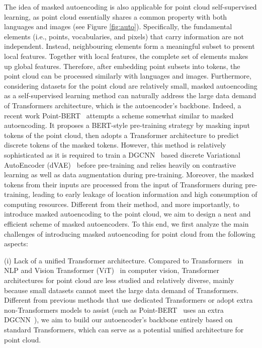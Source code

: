 \documentclass[runningheads]{llncs}
\begin{document}
The idea of masked autoencoding is also applicable for point cloud self-supervised learning, as point cloud essentially shares a common property with both languages and images (see Figure \ref{fig:auto}). Specifically, the fundamental elements (i.e., points, vocabularies, and pixels) that carry information are not independent. Instead, neighbouring elements form a meaningful subset to present local features. Together with local features, the complete set of elements makes up global features. Therefore, after embedding point subsets into tokens, the point cloud can be processed similarly with languages and images. Furthermore, considering datasets for the point cloud are relatively small, masked autoencoding as a self-supervised learning method can naturally address the large data demand of Transformers architecture, which is the autoencoder's backbone. Indeed, a recent work Point-BERT~\cite{pointbert} attempts a scheme somewhat similar to masked autoencoding. It proposes a BERT-style pre-training strategy by masking input tokens of the point cloud, then adopts a Transformer architecture to predict discrete tokens of the masked tokens. However, this method is relatively sophisticated as it is required to train a DGCNN~\cite{ptdgcnn} based discrete Variational AutoEncoder (dVAE)~\cite{dvae} before pre-training and relies heavily on contrastive learning as well as data augmentation during pre-training. Moreover, the masked tokens from their inputs are processed from the input of Transformers during pre-training, leading to early leakage of location information and high consumption of computing resources. Different from their method, and more importantly, to introduce masked autoencoding to the point cloud, we aim to design a neat and efficient scheme of masked autoencoders. To this end, we first analyze the main challenges of introducing masked autoencoding for point cloud from the following aspects:

(i) Lack of a unified Transformer architecture. Compared to Transformers~\cite{tf} in NLP and Vision Transformer (ViT)~\cite{cvvit} in computer vision, Transformer architectures for point cloud are less studied and relatively diverse, mainly because small datasets cannot meet the large data demand of Transformers. Different from previous methods that use dedicated Transformers or adopt extra non-Transformers models to assist (such as Point-BERT~\cite{pointbert} uses an extra DGCNN~\cite{ptdgcnn}), we aim to build our autoencoder's backbone entirely based on standard Transformers, which can serve as a potential unified architecture for point cloud.
\end{document}
